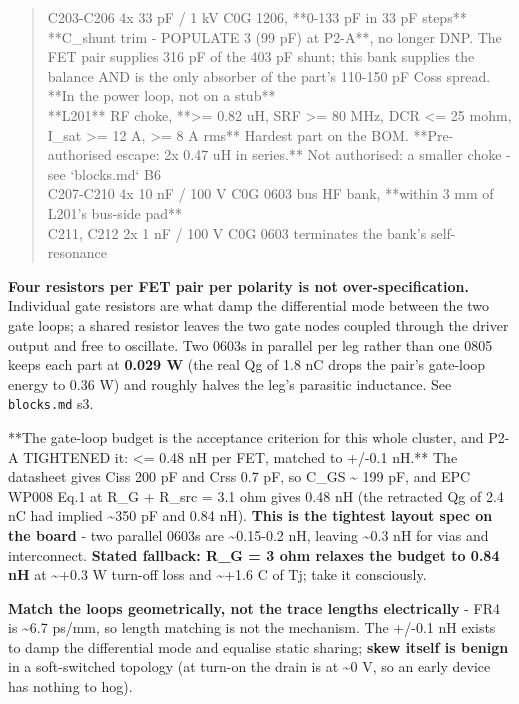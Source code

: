 \documentclass[11pt,a4paper]{article}
\begin{document}
\begin{quote}
\textbar{} C203-C206 \textbar{} 4x 33 pF / 1 kV C0G 1206, {*}{*}0-133 pF in 33 pF steps{*}{*} \textbar{} {*}{*}C\_shunt trim - POPULATE 3 (99 pF) at P2-A{*}{*}, no longer DNP. The FET pair supplies 316 pF of the 403 pF shunt; this bank supplies the balance AND is the only absorber of the part's 110-150 pF Coss spread. {*}{*}In the power loop, not on a stub{*}{*} \textbar{}\\
\textbar{} {*}{*}L201{*}{*} \textbar{} RF choke, {*}{*}\textgreater{}= 0.82 uH, SRF \textgreater{}= 80 MHz, DCR \textless{}= 25 mohm, I\_sat \textgreater{}= 12 A, \textgreater{}= 8 A rms{*}{*} \textbar{} Hardest part on the BOM. {*}{*}Pre-authorised escape: 2x 0.47 uH in series.{*}{*} Not authorised: a smaller choke - see `blocks.md` B6 \textbar{}\\
\textbar{} C207-C210 \textbar{} 4x 10 nF / 100 V C0G 0603 \textbar{} bus HF bank, {*}{*}within 3 mm of L201's bus-side pad{*}{*} \textbar{}\\
\textbar{} C211, C212 \textbar{} 2x 1 nF / 100 V C0G 0603 \textbar{} terminates the bank's self-resonance \textbar{}
\end{quote}
\textbf{Four resistors per FET pair per polarity is not over-specification.} Individual gate resistors are what damp the differential mode between the two gate loops; a shared resistor leaves the two gate nodes coupled through the driver output and free to oscillate. Two 0603s in parallel per leg rather than one 0805 keeps each part at \textbf{0.029 W} (the real Qg of 1.8 nC drops the pair's gate-loop energy to 0.36 W) and roughly halves the leg's parasitic inductance. See \texttt{blocks.md} s3.

{*}{*}The gate-loop budget is the acceptance criterion for this whole cluster, and P2-A TIGHTENED it: \textless{}= 0.48 nH per FET, matched to +/-0.1 nH.{*}{*} The datasheet gives Ciss 200 pF and Crss 0.7 pF, so C\_GS \textasciitilde{} 199 pF, and EPC WP008 Eq.1 at R\_G + R\_src = 3.1 ohm gives 0.48 nH (the retracted Qg of 2.4 nC had implied \textasciitilde{}350 pF and 0.84 nH). \textbf{This is the tightest layout spec on the board} - two parallel 0603s are \textasciitilde{}0.15-0.2 nH, leaving \textasciitilde{}0.3 nH for vias and interconnect. \textbf{Stated fallback: R\_G = 3 ohm relaxes the budget to 0.84 nH} at \textasciitilde{}+0.3 W turn-off loss and \textasciitilde{}+1.6 C of Tj; take it consciously.

\textbf{Match the loops geometrically, not the trace lengths electrically} - FR4 is \textasciitilde{}6.7 ps/mm, so length matching is not the mechanism. The +/-0.1 nH exists to damp the differential mode and equalise static sharing; \textbf{skew itself is benign} in a soft-switched topology (at turn-on the drain is at \textasciitilde{}0 V, so an early device has nothing to hog).
\end{document}
